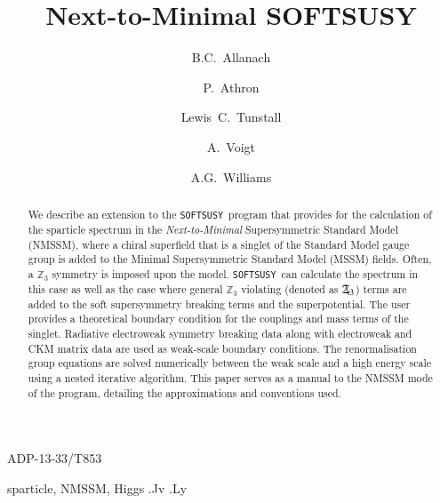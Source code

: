\documentclass[final,3p,times]{elsarticle}
\def\SOFTSUSY{{\tt SOFTSUSY}}
\newcommand{\Zv}{\,\mathbf{\backslash}\mkern-11.0mu{\mathbb{Z}}_{3}} %
\begin{document}
\begin{frontmatter}

\begin{flushright}
ADP-13-33/T853
\end{flushright}

\title{Next-to-Minimal SOFTSUSY}

\author[damtp]{B.C.~Allanach}
\author[adelaide]{P.~Athron}
\author[adelaide,bern]{Lewis~C.~Tunstall}
\author[dresden]{A.~Voigt}
\author[adelaide]{A.G.~Williams}
\address[damtp]{DAMTP, CMS, University of Cambridge, Wilberforce road, Cambridge, CB3
  0WA, United Kingdom}
\address[adelaide]{ARC Centre of Excellence for Particle Physics at 
the Tera-scale, School of Chemistry and Physics, University of Adelaide, 
Adelaide SA 5005 Australia}
\address[bern]{Albert Einstein Center for Fundamental Physics, Institute for Theoretical Physics, University of Bern, Sidlerstrasse 5, CH-3012 Bern, Switzerland}
\address[dresden]{Institut f\"ur Kern- und Teilchenphysik,
TU Dresden, Zellescher Weg 19, 01069 Dresden, Germany}

\begin{abstract}
  We describe an extension to the
  \SOFTSUSY~program that provides for the calculation of the sparticle spectrum in the
  {\em Next-to-Minimal} Supersymmetric Standard Model (NMSSM), where a chiral
  superfield that is a singlet of the Standard Model gauge group is added to
  the Minimal Supersymmetric Standard Model (MSSM) fields. Often, a $\mathbb{Z}_3$
  symmetry is 
  imposed upon the model. \SOFTSUSY~can calculate the spectrum in this
  case as well as the case where general $\mathbb{Z}_3$ violating (denoted as $\Zv$) terms are
  added to 
  the soft supersymmetry breaking terms and the superpotential. 
  The user provides a theoretical boundary condition for the couplings and
  mass terms of the singlet.
  Radiative electroweak symmetry breaking data along with
  electroweak and CKM matrix data are used
  as weak-scale boundary conditions. 
  The renormalisation group equations are solved
  numerically between the weak scale and a high energy scale using a nested
  iterative algorithm. 
  This paper serves as a manual to the
  NMSSM mode of the program, detailing the approximations and
  conventions used. 
\end{abstract}

\begin{keyword}
sparticle, 
NMSSM, Higgs
.Jv
.Ly
\end{keyword}
\end{frontmatter}
\end{document}
